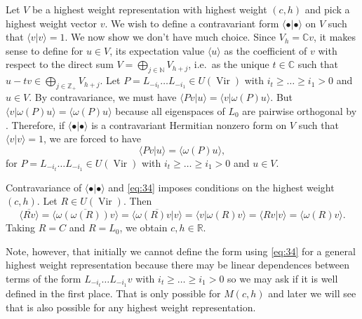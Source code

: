 \documentclass[a4paper, 12pt, reqno]{amsart}
\theoremstyle{remark}
\numberwithin{equation}{subsection}
\DeclareMathOperator{\Vir}{Vir}
\begin{document}
Let $V$ be a highest weight representation with highest weight $(c, h)$ and pick a highest weight vector $v$.
We wish to define a contravariant form $\langle \bullet| \bullet\rangle$ on $V$ such that $\langle v| v\rangle = 1$.
We now show we don't have much choice.
Since $V_h = \mathbb{C}v$, it makes sense to define for $u \in V$, its expectation value $\langle u\rangle$ as the coefficient of $v$ with respect to the direct sum $V = \bigoplus_{j \in \mathbb{N}}V_{h + j}$, i.e.\ as the unique $t \in \mathbb{C}$ such that $u - tv \in \bigoplus_{j \in \mathbb{Z}_+}V_{h + j}$.
Let $P = L_{-i_t}\dots L_{-i_1} \in U(\Vir)$ with $i_t \ge \dots \ge i_1 > 0$ and $u \in V$.
By contravariance, we must have $\langle Pv| u\rangle = \langle v| \omega(P)u\rangle$.
But $\langle v| \omega(P)u\rangle = \langle \omega(P)u\rangle$ because all eigenspaces of $L_0$ are pairwise orthogonal by .
Therefore, if $\langle \bullet| \bullet\rangle$ is a contravariant Hermitian nonzero form on $V$ such that $\langle v| v\rangle = 1$, we are forced to have
\begin{equation}
  \label{eq:34}
  \langle Pv| u\rangle = \langle \omega(P)u\rangle,
\end{equation}
for $P = L_{-i_t} \dots L_{-i_1} \in U(\Vir)$ with $i_t \ge \dots \ge i_1 > 0$ and $u \in V$.

Contravariance of $\langle \bullet| \bullet\rangle$ and \eqref{eq:34} imposes conditions on the highest weight $(c, h)$.
Let $R\in U(\Vir)$.
Then
\begin{equation*}
  \overline{\langle Rv\rangle} = \overline{\langle \omega(\omega(R))v\rangle} = \overline{\langle \omega(R)v| v\rangle} = \langle v| \omega(R)v\rangle = \langle Rv| v\rangle = \langle \omega(R)v\rangle.
\end{equation*}
Taking $R = C$ and $R = L_0$, we obtain $c, h \in \mathbb{R}$.

Note, however, that initially we cannot define the form using \eqref{eq:34} for a general highest weight representation because there may be linear dependences between terms of the form $L_{-i_t}\dots L_{-i_1}v$ with $i_t \ge \dots \ge i_1 > 0$ so we may ask if it is well defined in the first place.
That is only possible for $M(c, h)$ and later we will see that is also possible for any highest weight representation.
\end{document}
